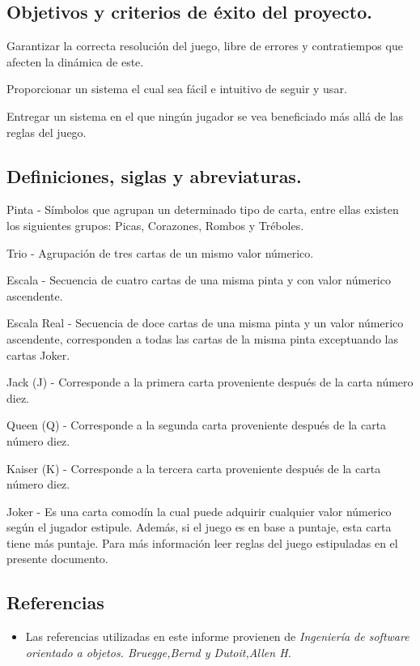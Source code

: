 \documentclass[60pt]{article}
\begin{document}
\subsection{Objetivos y criterios de éxito del proyecto.}\label{cap:objetivos}
Garantizar la correcta resolución del juego, libre de errores y contratiempos que afecten la dinámica de este.

Proporcionar un sistema el cual sea fácil e intuitivo de seguir y usar.

Entregar un sistema en el que ningún jugador se vea beneficiado más allá de las reglas del juego.
\subsection{Definiciones, siglas y abreviaturas.}\label{cap:definiciones}
Pinta - Símbolos que agrupan un determinado tipo de carta, entre ellas existen los siguientes grupos: Picas, Corazones, Rombos y Tréboles.

Trio - Agrupación de tres cartas de un mismo valor númerico.

Escala - Secuencia de cuatro cartas de una misma pinta y con valor númerico ascendente.

Escala Real - Secuencia de doce cartas de una misma pinta y un valor númerico ascendente, corresponden a todas las cartas de la misma pinta exceptuando las cartas Joker.

Jack (J) - Corresponde a la primera carta proveniente después de la carta número diez.

Queen (Q) - Corresponde a la segunda carta proveniente después de la carta número diez.

Kaiser (K) - Corresponde a la tercera carta proveniente después de la carta número diez.

Joker - Es una carta comodín la cual puede adquirir cualquier valor númerico según el jugador estipule. Además, si el juego es en base a puntaje, esta carta tiene más puntaje. Para más información leer reglas del juego estipuladas en el presente documento.
\subsection*{Referencias}
\begin{itemize}
    \item Las referencias utilizadas en este informe provienen de \textit{Ingeniería de software orientado a objetos. Bruegge,Bernd y Dutoit,Allen H.} \cite{oop}
\end{itemize}
\end{document}
